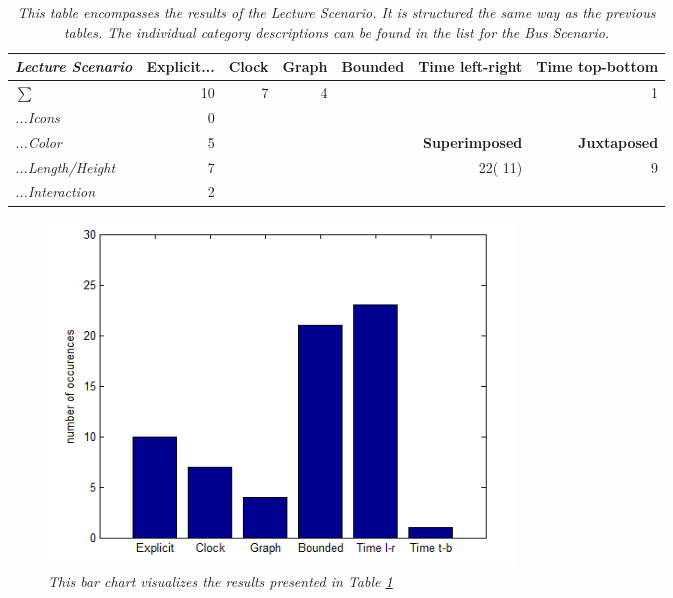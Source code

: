 \begin{table}[H]
	\centering
	\begin{tabular}{l|r|rrlrr}
		\cline{2-7}
		\textit{\textbf{Lecture Scenario}} & \multicolumn{1}{l|}{\textbf{Explicit...}} & \multicolumn{1}{l|}{\textbf{Clock}} & \multicolumn{1}{l|}{\textbf{Graph}} & \multicolumn{1}{l|}{\textbf{Bounded}} & \multicolumn{1}{l|}{\textbf{Time left-right}} & \multicolumn{1}{l|}{\textbf{Time top-bottom}} \\ \hline
		\multicolumn{1}{|l|}{\textit{$\sum$}} & \multicolumn{1}{r|}{10} & \multicolumn{1}{r|}{7} & \multicolumn{1}{r|}{4} & \multicolumn{1}{r|}{\cellcolor[HTML]{009901}{21}} & \multicolumn{1}{r|}{\cellcolor[HTML]{009901}{23}} & \multicolumn{1}{r|}{1} \\ \hline
		\multicolumn{1}{|l|}{\textit{\color[HTML]{555555}...Icons}} & 0 &  &  &  &  &  \\ \cline{1-1} \cline{2-2} \cline{6-7} 
		\multicolumn{1}{|l|}{\textit{\color[HTML]{555555}...Color}} & 5 &  &  & \multicolumn{1}{l|}{} & \multicolumn{1}{r|}{\textbf{Superimposed}} & \multicolumn{1}{r|}{\textbf{Juxtaposed}} \\ \cline{1-1} \cline{2-2} \cline{6-7} 
		\multicolumn{1}{|l|}{\textit{\color[HTML]{555555}...Length/Height}} & 7 &  &  & \multicolumn{1}{l|}{} & \multicolumn{1}{r|}{22({\color[HTML]{CB0000}  11})} & \multicolumn{1}{r|}{9} \\ \cline{1-1} \cline{2-2} \cline{6-7} 
		\multicolumn{1}{|l|}{\textit{\color[HTML]{555555}...Interaction}} & 2 &  &  & \textit{} &  &  \\ \cline{1-1} \cline{2-2}
	\end{tabular}
\caption{\textit{This table encompasses the results of the \textit{Lecture Scenario}. It is structured the same way as the previous tables. The individual category descriptions can be found in the list for the \textit{Bus Scenario}.}}
\label{tb:t4}
\end{table}

\begin{figure}[H]
	\centering
	\includegraphics[width=0.6\textwidth]{figures/barT4.PNG}
	\caption{\textit{This bar chart visualizes the results presented in Table \ref{tb:t4}}}
	\label{fig:t4bar}
\end{figure}